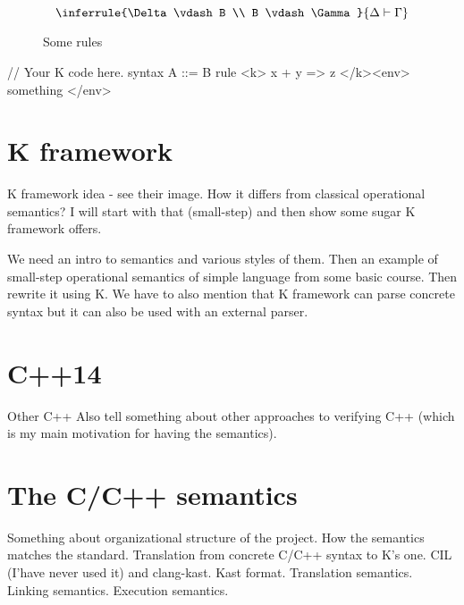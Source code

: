 \documentclass{fithesis3}
\begin{document}
\begin{figure}[H]

\caption{Some rules }

\[
\inferrule
{\Delta \vdash B \\ B \vdash \Gamma}
{\Delta \vdash \Gamma}
\]

\end{figure}

\begin{kcode}
    // Your K code here.
    syntax A ::= B
    rule <k> x + y => z </k><env> something </env>
\end{kcode}

\section{K framework}
K framework idea - see their image.
How it differs from classical operational semantics? I will start with that (small-step) and then show some sugar K framework offers.

We need an intro to semantics and various styles of them. Then an example of small-step operational semantics of simple language from some basic course. Then rewrite it using K. We have to also mention that K framework can parse concrete syntax but it can also be used with an external parser.


\section{C++14}
Other C++ Also tell something about other approaches to verifying C++ (which is my main motivation for having the semantics).

\section{The C/C++ semantics}
Something about organizational structure of the project. How the semantics matches the standard. Translation from concrete C/C++ syntax to K's one. CIL (I'have never used it) and clang-kast. Kast format.
Translation semantics. Linking semantics. Execution semantics.
\end{document}
